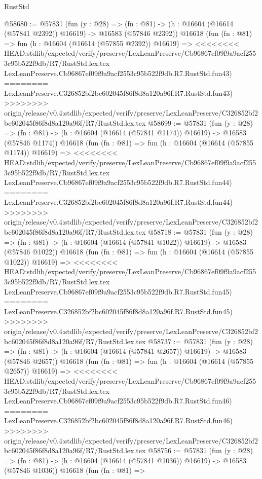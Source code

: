 \begin{lexlean}{RustStd}
\begin{coremodule}
{\begin{coremodule}
{{{{{{{{{{{{{{{{{{{{{{{{{{{{{{{{{{{{{{{{{{{{{{{{{{{{{{{@58680 := @57831
    (fun (y : @28) =>
    (fn : @81) -> (h : @16604 (@16614 (@57841 @2392)) @16619) -> @16583 (@57846 @2392))
    @16618
    (fun (fn : @81) =>
    fun (h : @16604 (@16614 (@57855 @2392)) @16619) =>
<<<<<<<< HEAD:stdlib/expected/verify/preserve/LexLeanPreserve/Cb96867ef09f9a9acf2553c95b522f9db/R7/RustStd.lex.tex
    LexLeanPreserve.Cb96867ef09f9a9acf2553c95b522f9db.R7.RustStd.fun43)
========
    LexLeanPreserve.C326852bf2bc602045f86f8d8a120a96f.R7.RustStd.fun43)
>>>>>>>> origin/release/v0.4:stdlib/expected/verify/preserve/LexLeanPreserve/C326852bf2bc602045f86f8d8a120a96f/R7/RustStd.lex.tex
@58699 := @57831
    (fun (y : @28) =>
    (fn : @81) -> (h : @16604 (@16614 (@57841 @1174)) @16619) -> @16583 (@57846 @1174))
    @16618
    (fun (fn : @81) =>
    fun (h : @16604 (@16614 (@57855 @1174)) @16619) =>
<<<<<<<< HEAD:stdlib/expected/verify/preserve/LexLeanPreserve/Cb96867ef09f9a9acf2553c95b522f9db/R7/RustStd.lex.tex
    LexLeanPreserve.Cb96867ef09f9a9acf2553c95b522f9db.R7.RustStd.fun44)
========
    LexLeanPreserve.C326852bf2bc602045f86f8d8a120a96f.R7.RustStd.fun44)
>>>>>>>> origin/release/v0.4:stdlib/expected/verify/preserve/LexLeanPreserve/C326852bf2bc602045f86f8d8a120a96f/R7/RustStd.lex.tex
@58718 := @57831
    (fun (y : @28) =>
    (fn : @81) -> (h : @16604 (@16614 (@57841 @1022)) @16619) -> @16583 (@57846 @1022))
    @16618
    (fun (fn : @81) =>
    fun (h : @16604 (@16614 (@57855 @1022)) @16619) =>
<<<<<<<< HEAD:stdlib/expected/verify/preserve/LexLeanPreserve/Cb96867ef09f9a9acf2553c95b522f9db/R7/RustStd.lex.tex
    LexLeanPreserve.Cb96867ef09f9a9acf2553c95b522f9db.R7.RustStd.fun45)
========
    LexLeanPreserve.C326852bf2bc602045f86f8d8a120a96f.R7.RustStd.fun45)
>>>>>>>> origin/release/v0.4:stdlib/expected/verify/preserve/LexLeanPreserve/C326852bf2bc602045f86f8d8a120a96f/R7/RustStd.lex.tex
@58737 := @57831
    (fun (y : @28) =>
    (fn : @81) -> (h : @16604 (@16614 (@57841 @2657)) @16619) -> @16583 (@57846 @2657))
    @16618
    (fun (fn : @81) =>
    fun (h : @16604 (@16614 (@57855 @2657)) @16619) =>
<<<<<<<< HEAD:stdlib/expected/verify/preserve/LexLeanPreserve/Cb96867ef09f9a9acf2553c95b522f9db/R7/RustStd.lex.tex
    LexLeanPreserve.Cb96867ef09f9a9acf2553c95b522f9db.R7.RustStd.fun46)
========
    LexLeanPreserve.C326852bf2bc602045f86f8d8a120a96f.R7.RustStd.fun46)
>>>>>>>> origin/release/v0.4:stdlib/expected/verify/preserve/LexLeanPreserve/C326852bf2bc602045f86f8d8a120a96f/R7/RustStd.lex.tex
@58756 := @57831
    (fun (y : @28) =>
    (fn : @81) -> (h : @16604 (@16614 (@57841 @1036)) @16619) -> @16583 (@57846 @1036))
    @16618
    (fun (fn : @81) =>
}}}}}}}}}}}}}}}}}}}}}}}}}}}}}}}}}}}}}}}}}}}}}}}}}}}}}}}
\end{coremodule}}
\end{coremodule}
\end{lexlean}
